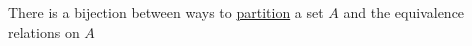 
There is a bijection between ways to \href{doc/1 math/Seven Sketches in Compositionality/1 Chapter 1: Generative Effects/2 What is order/Partition}{partition} a set $A$ and the equivalence relations on $A$